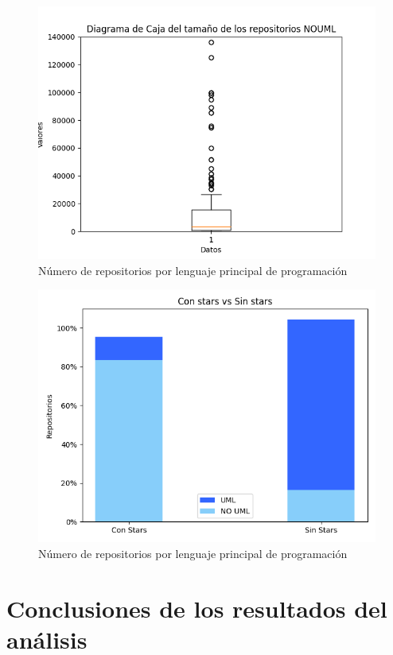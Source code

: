 \documentclass[a4paper, 12pt]{book}
\begin{document}
\begin{figure}
  \centering
  \includegraphics[width=12cm, keepaspectratio]{img/Figure_sizeNOUML.png}
  \caption{Número de repositorios por lenguaje principal de programación}\label{fig:Figure_sizeNOUML}
\end{figure}

\begin{figure}
  \centering
  \includegraphics[width=12cm, keepaspectratio]{img/Figure_stars.png}
  \caption{Número de repositorios por lenguaje principal de programación}\label{fig:Figure_stars}
\end{figure}


\section{Conclusiones de los resultados del análisis}
\label{sec:conclusiones de los resultados del análisis}
\end{document}
